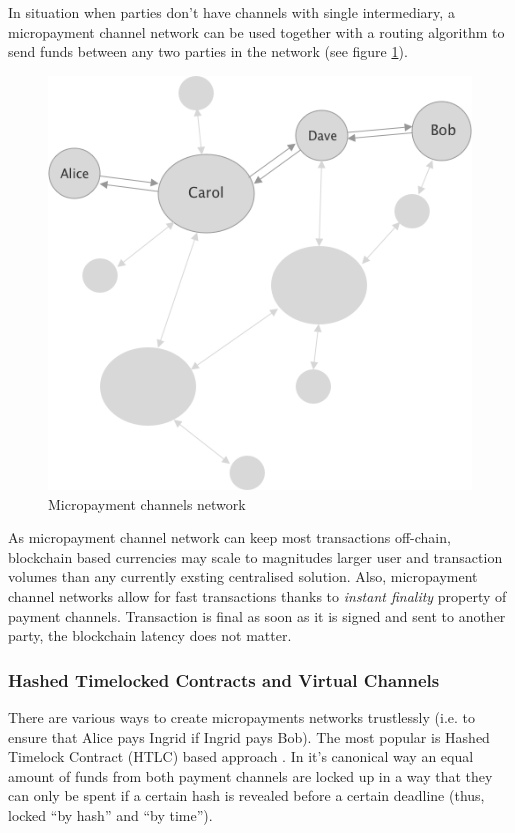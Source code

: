 \documentclass[a4paper,12pt]{article}
\begin{document}
In situation when parties don't have channels with single intermediary, a 
micropayment channel network can be used together with a routing algorithm to 
send funds between any two parties in the network (see figure \ref{img:lightning}).

\begin{figure}[H]
    \centering
    \includegraphics[scale=0.5]{img/lightning-network}
    \caption{Micropayment channels network}
    \label{img:lightning}
\end{figure}

As micropayment channel network can keep most transactions off-chain, blockchain 
based currencies may scale to magnitudes larger user and transaction volumes than 
any currently exsting centralised solution. Also, micropayment channel networks 
allow for fast transactions thanks to \textit{instant finality} property of 
payment channels. Transaction is final as soon as it is signed and sent to 
another party, the blockchain latency does not matter. \\

\subsubsection{Hashed Timelocked Contracts and Virtual Channels}

There are various ways to create micropayments networks trustlessly (i.e. to 
ensure that Alice pays Ingrid if Ingrid pays Bob). The most popular is Hashed 
Timelock Contract (HTLC) based approach \cite{lightning}. In it's canonical way 
an equal amount of funds from both payment channels are locked up in a way that 
they can only be spent if a certain hash is revealed before a certain deadline 
(thus, locked “by hash” and “by time”). 
\end{document}
